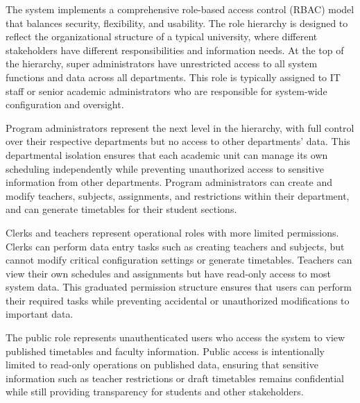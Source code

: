 \documentclass[12pt,a4paper]{article}
\begin{document}
The system implements a comprehensive role-based access control (RBAC) model that balances security, flexibility, and usability. The role hierarchy is designed to reflect the organizational structure of a typical university, where different stakeholders have different responsibilities and information needs. At the top of the hierarchy, super administrators have unrestricted access to all system functions and data across all departments. This role is typically assigned to IT staff or senior academic administrators who are responsible for system-wide configuration and oversight.

Program administrators represent the next level in the hierarchy, with full control over their respective departments but no access to other departments' data. This departmental isolation ensures that each academic unit can manage its own scheduling independently while preventing unauthorized access to sensitive information from other departments. Program administrators can create and modify teachers, subjects, assignments, and restrictions within their department, and can generate timetables for their student sections.

Clerks and teachers represent operational roles with more limited permissions. Clerks can perform data entry tasks such as creating teachers and subjects, but cannot modify critical configuration settings or generate timetables. Teachers can view their own schedules and assignments but have read-only access to most system data. This graduated permission structure ensures that users can perform their required tasks while preventing accidental or unauthorized modifications to important data.

The public role represents unauthenticated users who access the system to view published timetables and faculty information. Public access is intentionally limited to read-only operations on published data, ensuring that sensitive information such as teacher restrictions or draft timetables remains confidential while still providing transparency for students and other stakeholders.
\end{document}
